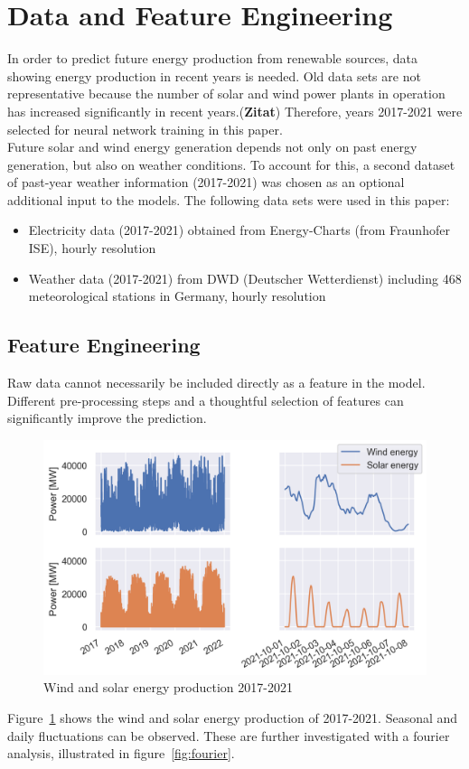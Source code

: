 \documentclass[11pt,table]{article}
\begin{document}
\section{Data and Feature Engineering}
In order to predict future energy production from renewable sources, data showing energy production in recent years is needed. Old data sets are not representative because the number of solar and wind power plants in operation has increased significantly in recent years.(\textbf{Zitat}) Therefore, years 2017-2021 were selected for neural network training in this paper. \\
Future solar and wind energy generation depends not only on past energy generation, but also on weather conditions. To account for this, a second dataset of past-year weather information (2017-2021) was chosen as an optional additional input to the models.
The following data sets were used in this paper:

\begin{itemize}
  \item Electricity data (2017-2021) obtained from Energy-Charts (from Fraunhofer ISE), hourly resolution
  \item Weather data (2017-2021) from DWD (Deutscher Wetterdienst) including 468 meteorological stations in Germany, hourly resolution
\end{itemize}%

\subsection{Feature Engineering}
Raw data cannot necessarily be included directly as a feature in the model. Different pre-processing steps and a thoughtful selection of features can significantly improve the prediction. 
\begin{figure}[H]
	\centering
	\includegraphics[scale=0.9]{Figures/electrData.png}
	\caption{Wind and solar energy production 2017-2021}
	\label{fig:electrData}
\end{figure}
Figure~\ref{fig:electrData} shows the wind and solar energy production of 2017-2021. Seasonal and daily fluctuations can be observed. These are further investigated with a fourier analysis, illustrated in figure~\ref{fig:fourier}.
\end{document}
